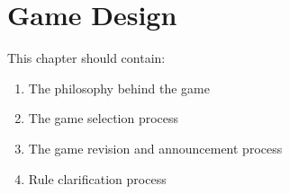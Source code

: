 \section{Game Design}

This chapter should contain:
\begin{enumerate}
\item The philosophy behind the game
\item The game selection process
\item The game revision and announcement process
\item Rule clarification process
\end{enumerate}
